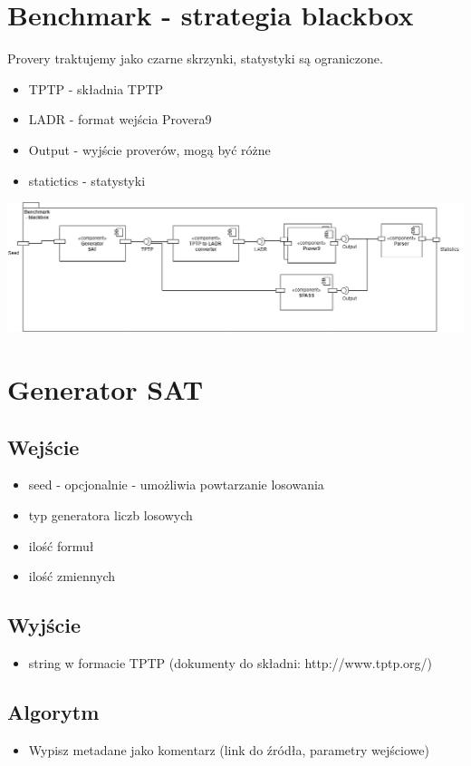 \documentclass[a4paper,12pt]{article}
\begin{document}
\section{Benchmark - strategia blackbox}
Provery traktujemy jako czarne skrzynki, statystyki są ograniczone.\newline
\begin{itemize}
    \item TPTP - składnia TPTP
    \item LADR - format wejścia Provera9
    \item Output - wyjście proverów, mogą być różne
    \item statictics - statystyki
\end{itemize}
\includegraphics[scale=0.4]{images/studio-projektowe1.png}
\newpage

\section{Generator SAT}
\subsection{Wejście}
\begin{itemize}
    \item seed - opcjonalnie - umożliwia powtarzanie losowania
    \item typ generatora liczb losowych
    \item ilość formuł
    \item ilość zmiennych
\end{itemize}


\subsection{Wyjście}
\begin{itemize}
    \item string w formacie TPTP (dokumenty do składni: http://www.tptp.org/)
\end{itemize}

\subsection{Algorytm}
\begin{itemize}
    \item Wypisz metadane jako komentarz (link do źródła, parametry wejściowe)
\end{itemize}
\end{document}
